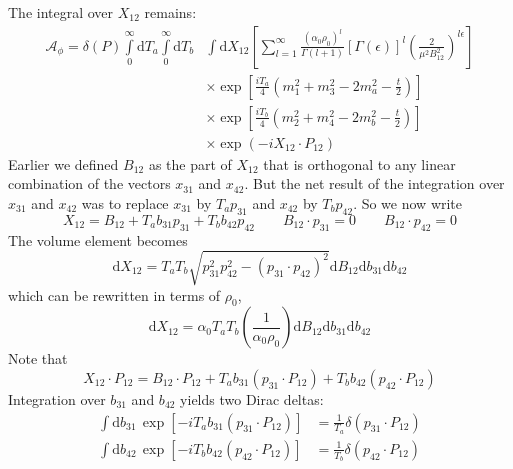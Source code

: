 The integral over $X_{12}$ remains:
\begin{equation}
\begin{split}
	\mathcal{A}_{\phi} = \delta(P) \int\limits_{0}^{\infty} \mathrm{d}T_{a} \int\limits_{0}^{\infty} \mathrm{d}T_{b} {}& \int \mathrm{d}X_{12} \left[ \sum_{l = 1}^{\infty} \frac{\left(\alpha_{0} \rho_{0} \right)^{l}}{\Gamma(l + 1)} [\Gamma(\epsilon)]^{l} \left(\frac{2}{\mu^{2} B_{12}^{2}} \right)^{l \epsilon} \right] \\
	&\times \exp{\left[ \frac{i T_{a}}{4} \left(m_{1}^{2} + m_{3}^{2} - 2 m_{a}^{2} - \frac{t}{2} \right) \right]} \\
	&\times \exp{\left[ \frac{i T_{b}}{4} \left(m_{2}^{2} + m_{4}^{2} - 2 m_{b}^{2} - \frac{t}{2} \right) \right]} \\
	&\times \exp{\left(- i X_{12} \cdot P_{12} \right)}
\end{split} \label{IntX12}
\end{equation}
Earlier we defined $B_{12}$ as the part of $X_{12}$ that is orthogonal to any linear combination of the vectors $x_{31}$ and $x_{42}$. But the net result of the integration over $x_{31}$ and $x_{42}$ was to replace $x_{31}$ by $ T_{a} p_{31}$ and $x_{42}$ by $ T_{b} p_{42}$. So we now write
\begin{equation}
	X_{12} = B_{12} + T_{a} b_{31} p_{31} + T_{b} b_{42} p_{42} \qquad B_{12} \cdot p_{31} = 0 \qquad B_{12} \cdot p_{42} = 0
\end{equation}
The volume element becomes
\begin{equation}
	\mathrm{d}X_{12} = T_{a} T_{b} \sqrt{p_{31}^{2} p_{42}^{2} - (p_{31} \cdot p_{42})^{2}} \mathrm{d}B_{12} \mathrm{d}b_{31} \mathrm{d}b_{42}
\end{equation}
which can be rewritten in terms of $\rho_{0}$,
\begin{equation}
	\mathrm{d}X_{12} = \alpha_{0} T_{a} T_{b} \left( \frac{1}{\alpha_{0} \rho_{0}} \right) \mathrm{d}B_{12} \mathrm{d}b_{31} \mathrm{d}b_{42} \label{dX12Sca}
\end{equation}
Note that
\begin{equation}
	X_{12} \cdot P_{12} = B_{12} \cdot P_{12} + T_{a} b_{31} (p_{31} \cdot P_{12}) + T_{b} b_{42} (p_{42} \cdot P_{12})
\end{equation}
Integration over $b_{31}$ and $b_{42}$ yields two Dirac deltas:
\begin{align}
	\int \mathrm{d}b_{31} \, \exp{\left[- i T_{a} b_{31} (p_{31} \cdot P_{12}) \right]} &= \frac{1}{T_{a}} \delta(p_{31} \cdot P_{12}) \\
	\int \mathrm{d}b_{42} \, \exp{\left[- i T_{b} b_{42} (p_{42} \cdot P_{12}) \right]} &= \frac{1}{T_{b}}  \delta(p_{42} \cdot P_{12})
\end{align}
